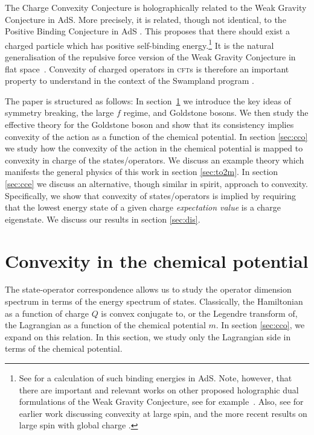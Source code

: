 \documentclass[11pt]{article}
\numberwithin{equation}{section}
\begin{document}
	The Charge Convexity Conjecture is holographically related to the Weak Gravity Conjecture \cite{Arkani-Hamed:2006emk} in AdS. More precisely, it is related, though not identical, to the Positive Binding Conjecture in AdS \cite{Aharony:2021mpc}. This proposes that there should exist a charged particle which has positive self-binding energy.\footnote{See \cite{Andriolo:2022hax} for a calculation of such binding energies in AdS. Note, however, that there are important and relevant works on other proposed holographic dual formulations of the Weak Gravity Conjecture, see for example~\cite{Nakayama:2015hga,Montero:2016tif,Montero:2018fns}. Also, see \cite{Komargodski:2012ek} for earlier work discussing convexity at large spin, and the more recent results on large spin with global charge \cite{Cuomo:2022kio}.} 	It is the natural generalisation of the repulsive force version of the Weak Gravity Conjecture in flat space~\cite{Palti:2017elp,Heidenreich:2019zkl}. Convexity of charged operators in \textsc{cft}s is therefore an important property to understand in the context of the Swampland program \cite{Vafa:2005ui,Palti:2019pca,vanBeest:2021lhn,Palti:2020mwc}. 
	
	
	The paper is structured as follows: In section~\ref{sec:ccp} we introduce the key ideas of symmetry breaking, the large $f$ regime, and Goldstone bosons. We then study the effective theory for the Goldstone boson and show that its consistency implies convexity of the action as a function of the chemical potential. In section \ref{sec:cco} we study how the convexity of the action in the chemical potential is mapped to convexity in charge of the states/operators. We discuss an example theory which manifests the general physics of this work in section \ref{sec:to2m}. In section \ref{sec:cce} we discuss an alternative, though similar in spirit, approach to convexity. Specifically, we show that convexity of states/operators is implied by requiring that the lowest energy state of a given charge {\it expectation value} is a charge eigenstate. We discuss our results in section \ref{sec:dis}.
	
\section{Convexity in the chemical potential}
\label{sec:ccp}

The state-operator correspondence allows us to study the operator dimension spectrum in terms of the energy spectrum of states. Classically, the Hamiltonian as a function of charge $Q$ is convex conjugate to, or the Legendre transform of, the Lagrangian as a function of the chemical potential $m$. In section \ref{sec:cco}, we expand on this relation. In this section, we study only the Lagrangian side in terms of the chemical potential. 
\end{document}
